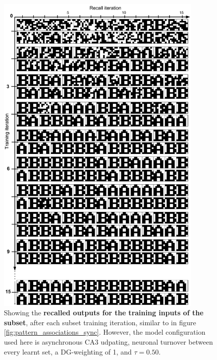 \begin{figure}
    \centering
    \includegraphics[width=10cm]{fig/AB-pattern-associations-async-tm0-dgw1-tau050}
    \caption{Showing the \textbf{recalled outputs for the training inputs of the subset}, after each subset training iteration, similar to in figure \ref{fig:pattern_associations_sync}. However, the model configuration used here is asynchronous CA3 udpating, neuronal turnover between every learnt set, a DG-weighting of 1, and $\tau=0.50$.}
    \label{fig:pattern_associations_async}
\end{figure}

